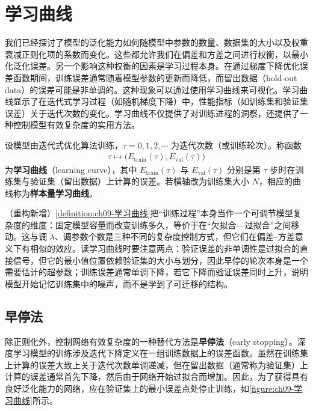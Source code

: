\documentclass[../../main.tex]{subfiles}
\begin{document}
\section{学习曲线}\label{section:ch09-学习曲线}

我们已经探讨了模型的泛化能力如何随模型中参数的数量、数据集的大小以及权重衰减正则化项的系数而变化。这些都允许我们在偏差和方差之间进行权衡，以最小化泛化误差。另一个影响这种权衡的因素是学习过程本身。在通过梯度下降优化误差函数期间，训练误差通常随着模型参数的更新而降低，而留出数据（hold-out data）的误差可能是非单调的。这种现象可以通过使用学习曲线来可视化。学习曲线显示了在迭代式学习过程（如随机梯度下降）中，性能指标（如训练集和验证集误差）关于迭代次数的变化。学习曲线不仅提供了对训练进程的洞察，还提供了一种控制模型有效复杂度的实用方法。

\begin{definition}[学习曲线]\label{definition:ch09-学习曲线}
设模型由迭代式优化算法训练，$\tau=0,1,2,\cdots$ 为迭代次数（或训练轮次）。称函数
\begin{align*}
\tau\mapsto\bigl(E_{\mathrm{train}}(\tau),E_{\mathrm{val}}(\tau)\bigr)
\end{align*}
为\textbf{学习曲线}（learning curve），其中 $E_{\mathrm{train}}(\tau)$ 与 $E_{\mathrm{val}}(\tau)$ 分别是第 $\tau$ 步时在训练集与验证集（留出数据）上计算的误差。若横轴改为训练集大小 $N$，相应的曲线称为\textbf{样本量学习曲线}。
\end{definition}

\begin{remark}（重构新增）\cref{definition:ch09-学习曲线}把“训练过程”本身当作一个可调节模型复杂度的维度：固定模型容量而改变训练多久，等价于在“欠拟合—过拟合”之间移动。这与调 $\lambda$、调参数个数是三种不同的复杂度控制方式，但它们在偏差--方差意义下有相似的效应。读学习曲线时要注意两点：验证误差的非单调性是过拟合的直接信号，但它的最小值位置依赖验证集的大小与划分，因此早停的轮次本身是一个需要估计的超参数；训练误差通常单调下降，若它下降而验证误差同时上升，说明模型开始记忆训练集中的噪声，而不是学到了可迁移的结构。
\end{remark}

\subsection{早停法}\label{subsection:ch09-早停法}

除正则化外，控制网络有效复杂度的一种替代方法是\textbf{早停法}（early stopping）。深度学习模型的训练涉及迭代下降定义在一组训练数据上的误差函数。虽然在训练集上计算的误差大致上关于迭代次数单调递减，但在留出数据（通常称为验证集）上计算的误差通常首先下降，然后由于网络开始过拟合而增加。因此，为了获得具有良好泛化能力的网络，应在验证集上的最小误差点处停止训练，如\cref{figure:ch09-学习曲线}所示。
\end{document}
